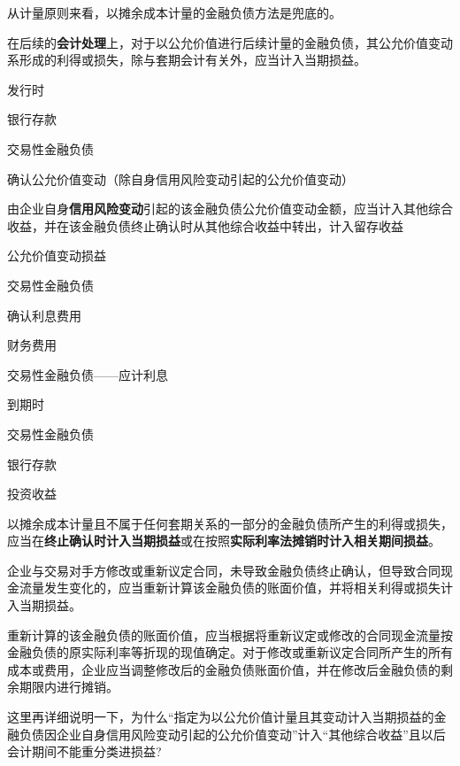 \documentclass[UTF8,12pt]{ctexart}
\newenvironment{Dr}{%
	\begin{list}{}%
		{
			\setlength{\leftmargin}{2em}
			\setlength{\labelwidth}{2em}
			\setlength{\labelsep}{0pt}
			\setlength{\itemindent}{0pt}
			\setlength{\listparindent}{0pt}
			\setlength{\parsep}{0pt}
			\setlength{\topsep}{0pt}
		}
		\item[\textbf{借：}]
	}{%
	\end{list}
}
\newenvironment{Cr}{%
	\begin{list}{}%
		{
			\setlength{\leftmargin}{3em}
			\setlength{\labelwidth}{2em}
			\setlength{\labelsep}{0pt}
			\setlength{\itemindent}{0pt}
			\setlength{\listparindent}{0pt}
			\setlength{\parsep}{0pt}
			\setlength{\topsep}{0pt}
		}
		\item[\textbf{贷：}]
	}{%
	\end{list}
}
\numberwithin{equation}{section} %
\numberwithin{figure}{section}
\numberwithin{table}{section}
\begin{document}
	从计量原则来看，以摊余成本计量的金融负债方法是兜底的。
	
	在后续的\textbf{会计处理}上，对于以公允价值进行后续计量的金融负债，其公允价值变动系形成的利得或损失，除与套期会计有关外，应当计入当期损益。
	
	发行时
	
	\begin{Dr}
		银行存款
	\end{Dr}
	\begin{Cr}
		交易性金融负债
	\end{Cr}
	
	确认公允价值变动（除自身信用风险变动引起的公允价值变动）
	
	由企业自身\textbf{信用风险变动}引起的该金融负债公允价值变动金额，应当计入其他综合收益，并在该金融负债终止确认时从其他综合收益中转出，计入留存收益
	
	\begin{Dr}
		公允价值变动损益
	\end{Dr}
	\begin{Cr}
		交易性金融负债
	\end{Cr}
	
	确认利息费用
	
	\begin{Dr}
		财务费用
	\end{Dr}
	\begin{Cr}
		交易性金融负债——应计利息
	\end{Cr}
	
	到期时
	
	\begin{Dr}
		交易性金融负债
	\end{Dr}
	\begin{Cr}
		银行存款
		
		投资收益
	\end{Cr}

	以摊余成本计量且不属于任何套期关系的一部分的金融负债所产生的利得或损失，应当在\textbf{终止确认时计入当期损益}或在按照\textbf{实际利率法摊销时计入相关期间损益}。
	
	企业与交易对手方修改或重新议定合同，未导致金融负债终止确认，但导致合同现金流量发生变化的，应当重新计算该金融负债的账面价值，并将相关利得或损失计入当期损益。
	
	重新计算的该金融负债的账面价值，应当根据将重新议定或修改的合同现金流量按金融负债的原实际利率等折现的现值确定。对于修改或重新议定合同所产生的所有成本或费用，企业应当调整修改后的金融负债账面价值，并在修改后金融负债的剩余期限内进行摊销。
	
	这里再详细说明一下，为什么“指定为以公允价值计量且其变动计入当期损益的金融负债因企业自身信用风险变动引起的公允价值变动”计入“其他综合收益”且以后会计期间不能重分类进损益?
	
\end{document}
